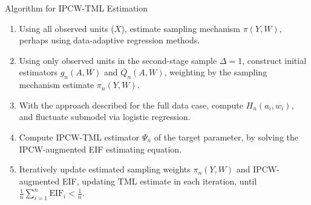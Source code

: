 \documentclass{beamer}
\begin{document}
\begin{frame}[c]{Algorithm for IPCW-TML Estimation}

\begin{center}
\begin{enumerate}\label{ipcwtmle_algo}
  \itemsep8pt
  \item Using all observed units ($X$), estimate sampling mechanism
    $\pi(Y, W)$, perhaps using data-adaptive regression methods.
  \item Using only observed units in the second-stage sample $\Delta = 1$,
    construct initial estimators $g_n(A, W)$ and $\overline{Q}_n(A, W)$,
    weighting by the sampling mechanism estimate $\pi_n(Y, W)$.
  \item With the approach described for the full data case, compute
    $H_n(a_i,w_i)$, and fluctuate submodel via logistic regression.
  \item Compute IPCW-TML estimator $\Psi_n$ of the target parameter, by solving
    the IPCW-augmented EIF estimating equation.
  \item Iteratively update estimated sampling weights $\pi_n(Y,W)$ and
    IPCW-augmented EIF, updating TML estimate in each iteration, until
    $\frac{1}{n}\sum_{i = 1}^n \text{EIF}_i < \frac{1}{n}$.
\end{enumerate}
\end{center}


\end{frame}

\end{document}
